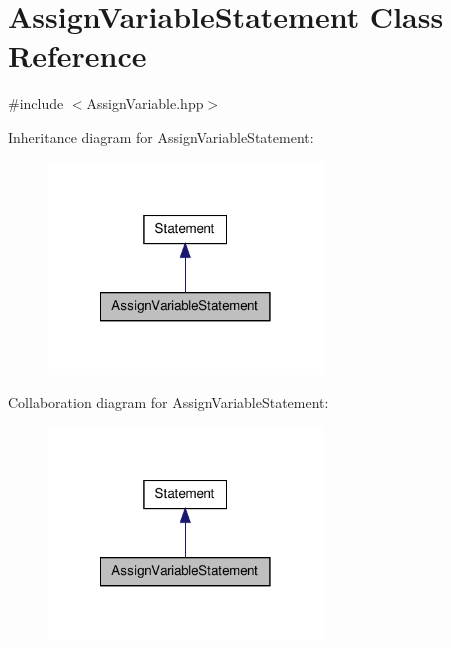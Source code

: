 \hypertarget{class_assign_variable_statement}{\section{Assign\-Variable\-Statement Class Reference}
\label{class_assign_variable_statement}
}


{\ttfamily \#include $<$Assign\-Variable.\-hpp$>$}



Inheritance diagram for Assign\-Variable\-Statement\-:
\nopagebreak
\begin{figure}[H]
\begin{center}
\leavevmode
\includegraphics[width=206pt]{class_assign_variable_statement__inherit__graph}
\end{center}
\end{figure}


Collaboration diagram for Assign\-Variable\-Statement\-:
\nopagebreak
\begin{figure}[H]
\begin{center}
\leavevmode
\includegraphics[width=206pt]{class_assign_variable_statement__coll__graph}
\end{center}
\end{figure}
